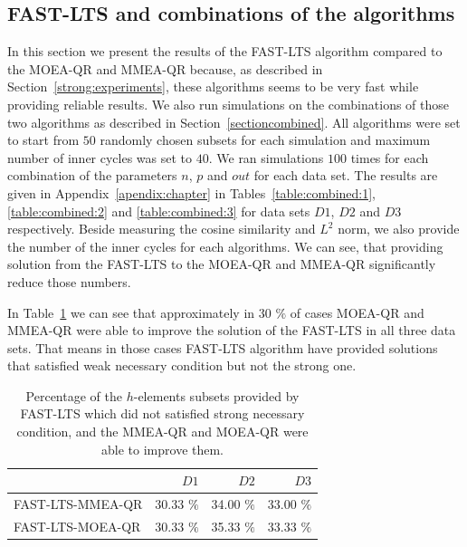 \subsection{FAST-LTS and combinations of the algorithms} \label{results:combinations}
In this section we present the results of the FAST-LTS algorithm compared to the MOEA-QR and MMEA-QR because, as described in Section~\ref{strong:experiments}, these algorithms seems to be very fast while providing reliable results. We also run simulations on the combinations of those two algorithms as described in Section~\ref{sectioncombined}. All algorithms were set to start from $50$ randomly chosen subsets for each simulation and maximum number of inner cycles was set to $40$. We ran simulations $100$ times for each combination of the parameters $n$, $p$ and $out$ for each data set. The results are given in Appendix~\ref{apendix:chapter} in Tables~\ref{table:combined:1}, \ref{table:combined:2} and \ref{table:combined:3} for data sets $D1$, $D2$ and $D3$ respectively. Beside measuring the cosine similarity and $L^2$ norm, we also provide the number of the inner cycles for each algorithms. We can see, that providing solution from the FAST-LTS to the MOEA-QR and MMEA-QR significantly reduce those numbers.
 
In Table~\ref{table:percentage:improvement} we can see that approximately in 30 $\%$ of cases MOEA-QR and MMEA-QR were able to improve the solution of the FAST-LTS in all three data sets. That means in those cases FAST-LTS algorithm have provided solutions that satisfied weak necessary condition but not the strong one. 

\begin{table}[h!]
    \centering
    \begin{tabular}{l|r|r|r|}
        \hline\hline
         &    $D1$ &    $D2$ &    $D3$ \\
         \hline
         FAST-LTS-MMEA-QR &  30.33 $\%$ &  34.00 $\%$ &  33.00 $\%$ \\FAST-LTS-MOEA-QR &  30.33 $\%$ &  35.33 $\%$ &  33.33 $\%$  \\
         \hline
         
    \end{tabular}

    \caption{Percentage of the $h$-elements subsets provided by FAST-LTS which did not satisfied strong necessary condition, and the MMEA-QR and MOEA-QR were able to improve them.}
    \label{table:percentage:improvement}
\end{table}

